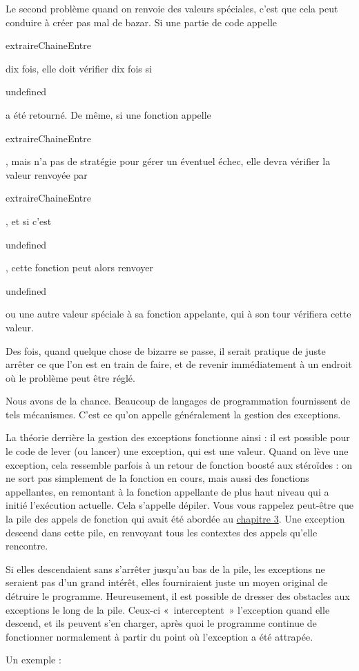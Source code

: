 \documentclass{FramateX}
\renewcommand{\texttt}[1]{\begin{sffamily}{#1}\end{sffamily}}
\begin{document}
Le second problème quand on renvoie des valeurs spéciales, c'est que
cela peut conduire à créer pas mal de bazar. Si une partie de code
appelle \texttt{extraireChaineEntre} dix fois, elle doit vérifier dix
fois si \texttt{undefined} a été retourné. De même, si une fonction
appelle \texttt{extraireChaineEntre}, mais n'a pas de stratégie pour
gérer un éventuel échec, elle devra vérifier la valeur renvoyée par
\texttt{extraireChaineEntre}, et si c'est \texttt{undefined}, cette
fonction peut alors renvoyer \texttt{undefined} ou une autre valeur
spéciale à sa fonction appelante, qui à son tour vérifiera cette valeur.

Des fois, quand quelque chose de bizarre se passe, il serait pratique de
juste arrêter ce que l'on est en train de faire, et de revenir
immédiatement à un endroit où le problème peut être réglé.

Nous avons de la chance. Beaucoup de langages de programmation
fournissent de tels mécanismes. C'est ce qu'on appelle généralement la
gestion des exceptions.

\begin{center}\end{center}

La théorie derrière la gestion des exceptions fonctionne ainsi : il est
possible pour le code de lever (ou lancer) une exception, qui est une
valeur. Quand on lève une exception, cela ressemble parfois à un retour
de fonction boosté aux stéroïdes : on ne sort pas simplement de la
fonction en cours, mais aussi des fonctions appellantes, en remontant à
la fonction appellante de plus haut niveau qui a initié l'exécution
actuelle. Cela s'appelle dépiler. Vous vous rappelez peut-être que la
pile des appels de fonction qui avait été abordée au
\href{chapter3.html}{chapitre 3}. Une exception descend dans cette pile,
en renvoyant tous les contextes des appels qu'elle rencontre.

Si elles descendaient sans s'arrêter jusqu'au bas de la pile, les
exceptions ne seraient pas d'un grand intérêt, elles fourniraient juste
un moyen original de détruire le programme. Heureusement, il est
possible de dresser des obstacles aux exceptions le long de la pile.
Ceux-ci «~interceptent~» l'exception quand elle descend, et ils peuvent
s'en charger, après quoi le programme continue de fonctionner
normalement à partir du point où l'exception a été attrapée.

Un exemple :
\end{document}
